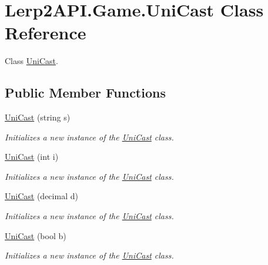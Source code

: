 \hypertarget{class_lerp2_a_p_i_1_1_game_1_1_uni_cast}{}\section{Lerp2\+A\+P\+I.\+Game.\+Uni\+Cast Class Reference}
\label{class_lerp2_a_p_i_1_1_game_1_1_uni_cast}


Class \hyperlink{class_lerp2_a_p_i_1_1_game_1_1_uni_cast}{Uni\+Cast}.  


\subsection*{Public Member Functions}
\begin{DoxyCompactItemize}
\item 
\hyperlink{class_lerp2_a_p_i_1_1_game_1_1_uni_cast_a6289e1b6b4ff6ae7287e4f304b22d087}{Uni\+Cast} (string s)
\begin{DoxyCompactList}\small\item\em Initializes a new instance of the \hyperlink{class_lerp2_a_p_i_1_1_game_1_1_uni_cast}{Uni\+Cast} class. \end{DoxyCompactList}\item 
\hyperlink{class_lerp2_a_p_i_1_1_game_1_1_uni_cast_add37c0736524043407545239380babde}{Uni\+Cast} (int i)
\begin{DoxyCompactList}\small\item\em Initializes a new instance of the \hyperlink{class_lerp2_a_p_i_1_1_game_1_1_uni_cast}{Uni\+Cast} class. \end{DoxyCompactList}\item 
\hyperlink{class_lerp2_a_p_i_1_1_game_1_1_uni_cast_ae6f6b405e50262d6d9c4ca03a255c219}{Uni\+Cast} (decimal d)
\begin{DoxyCompactList}\small\item\em Initializes a new instance of the \hyperlink{class_lerp2_a_p_i_1_1_game_1_1_uni_cast}{Uni\+Cast} class. \end{DoxyCompactList}\item 
\hyperlink{class_lerp2_a_p_i_1_1_game_1_1_uni_cast_a12ebf426db671515de776a0a42ff98ae}{Uni\+Cast} (bool b)
\begin{DoxyCompactList}\small\item\em Initializes a new instance of the \hyperlink{class_lerp2_a_p_i_1_1_game_1_1_uni_cast}{Uni\+Cast} class. \end{DoxyCompactList}\end{DoxyCompactItemize}

